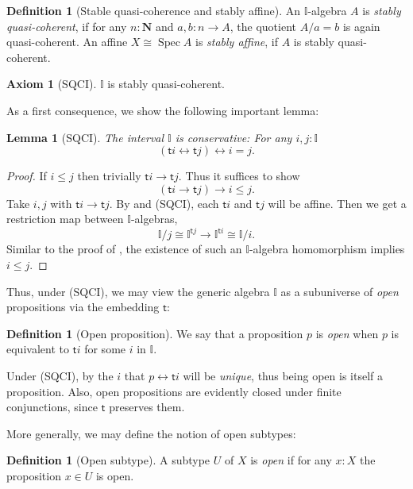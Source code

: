 \documentclass[a4paper,12pt]{amsart}
\newtheorem{lemma}[theorem]{Lemma}
\theoremstyle{definition}
\newtheorem{definition}[theorem]{Definition}
\newtheorem*{axiom}{Axiom}
\newcommand{\mb}[1]{\mathbf{#1}}
\newcommand{\mbb}[1]{\mathbb{#1}}
\newcommand{\I}{\mbb I}
\newcommand{\ms}[1]{\mathsf{#1}}
\newcommand{\N}{\mb N}
\newcommand{\eq}{\leftrightarrow}
\newcommand{\spec}{\operatorname{Spec}}
\begin{document}
\begin{definition}[Stable quasi-coherence and stably affine]
  An $\I$-algebra $A$ is \emph{stably quasi-coherent}, if for any $n : \N$ and $a,b \colon n \to A$, the quotient $A/a=b$ is again quasi-coherent. An affine $X \cong \spec A$ is \emph{stably affine}, if $A$ is stably quasi-coherent.
\end{definition}

\begin{axiom}[SQCI]\label{ax:sqci}
  $\I$ is stably quasi-coherent.
\end{axiom}

As a first consequence, we show the following important lemma:

\begin{lemma}[SQCI]\label{lem:intconserve}
  The interval $\I$ is \emph{conservative}: For any $i,j : \I$
  \[ (\ms ti \eq \ms tj) \eq i = j. \]
\end{lemma}
\begin{proof}
  If $i \le j$ then trivially $\ms ti \to \ms tj$. Thus it suffices to show
  \[ (\ms ti \to \ms tj) \to i \le j. \]
  Take $i,j$ with $\ms ti \to \ms tj$. By  and (SQCI), each $\ms ti$ and $\ms tj$ will be affine. Then we get a restriction map between $\I$-algebras,
  \[ \I/j \cong \I^{\ms tj} \to \I^{\ms ti} \cong \I/i. \]
  Similar to the proof of , the existence of such an $\I$-algebra homomorphism implies $i \le j$. 
\end{proof}

Thus, under (SQCI), we may view the generic algebra $\I$ as a subuniverse of \emph{open} propositions via the embedding $\ms t$:

\begin{definition}[Open proposition]
  We say that a proposition $p$ is \emph{open} when $p$ is equivalent to $\ms ti$ for some $i$ in $\I$.
\end{definition}

Under (SQCI), by  the $i$ that $p \eq \ms ti$ will be \emph{unique}, thus being open is itself a proposition. Also, open propositions are evidently closed under finite conjunctions, since $\ms t$ preserves them. 

More generally, we may define the notion of open subtypes:

\begin{definition}[Open subtype]
  A subtype $U$ of $X$ is \emph{open} if for any $x:X$ the proposition $x\in U$ is open.
\end{definition}
\end{document}
